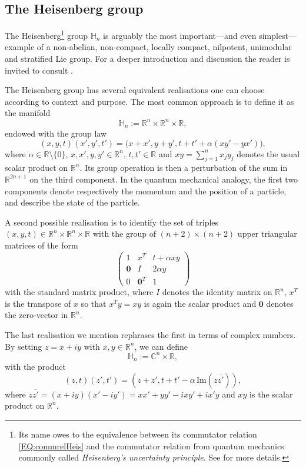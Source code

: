\documentclass[12pt,oneside,a4paper]{book}
\numberwithin{equation}{section}     %
\theoremstyle{plain}
\theoremstyle{definition}
\newcommand{\C}{{\mathbb C}}
\newcommand{\R}{{\mathbb R}}
\newcommand{\Rn}{{\R}^n}
\begin{document}
\subsection{The Heisenberg group}\label{Heisenberg}

The Heisenberg\footnote{Its name owes to the equivalence between its commutator relation \eqref{EQ:commrelHeis} and the commutator relation from quantum mechanics commonly called \textit{Heisenberg's uncertainty principle}. See \cite[Chapter 1]{Fol} for more details.} group $\mathbb{H}_n$ is arguably the most important---and even simplest---example of a non-abelian, non-compact, locally compact, nilpotent, unimodular and stratified Lie group. For a deeper introduction and discussion the reader is invited to consult \cite{FH1987,Fol,T1998,T2008}.

The Heisenberg group has several equivalent realisations one can choose according to context and purpose. The most common approach is to define it as the manifold
\[
\mathbb{H}_n:=\R^n\times\R^n\times\R,
\]
endowed  with the group law
\[
(x,y,t)(x',y',t')=\big(x+x',y+y',t+t'+\alpha(xy'-yx')\big),
\]
where $\alpha \in\R$\textbackslash$\{0\}$, $x,x',y,y'\in\Rn$, $t,t'\in\R$ and $xy=\sum_{j=1}^nx_jy_j$ denotes the usual scalar product on $\Rn$. Its group operation is then a perturbation of the sum in $\R^{2n+1}$ on the third component. In the quantum mechanical analogy, the first two components denote respectively the momentum and the position of a particle, and describe the state of the particle. 

A second possible realisation is to identify the set of triples $(x,y,t)\in\R^n\times\R^n\times\R$ with the group of $(n+2)\times(n+2)$ upper triangular matrices of the form
\[
\left(\begin{array}{c|c|c}
1 	& x^T 	& t+\alpha xy \\
\hline
\mathbf{0}	& I		& 2\alpha y \\
\hline
0	&\mathbf{0}^T		& 1
\end{array}\right)
\]
with the standard matrix product, where $I$ denotes the identity matrix on $\Rn$, $x^T$ is the transpose of $x$ so that $x^Ty=xy$ is again the scalar product and $\mathbf{0}$ denotes the zero-vector in $\Rn$. 

The last realisation we mention rephrases the first in terms of complex numbers. By setting $z=x+ i y$ with $x,y\in\Rn$, we can define
\[
\mathbb{H}_n:=\C^n\times\R,
\] 
with the product
\[
(z,t)(z',t')=(z+z',t+t'-\alpha \, \text{Im}(z\overline{z'})),
\]
where $z\overline{z'}=(x+iy)(x'-iy')=xx'+yy'-ixy'+ix'y$ and $xy$ is the scalar product on $\Rn$.
\end{document}
